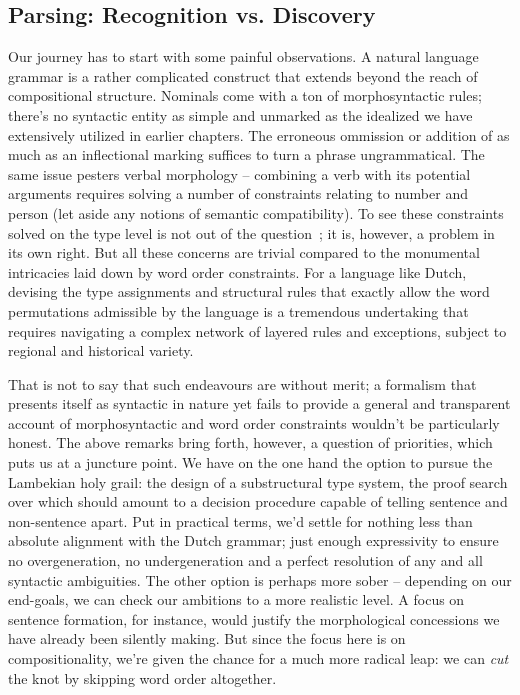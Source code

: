 \subsection{Parsing: Recognition vs. Discovery}
Our journey has to start with some painful observations.
A natural language grammar is a rather complicated construct that extends beyond the reach of compositional structure.
Nominals come with a ton of morphosyntactic rules; there's no syntactic entity as simple and unmarked as the idealized \np[s] we have extensively utilized in earlier chapters.
The erroneous ommission or addition of as much as an inflectional marking suffices to turn a phrase ungrammatical.
The same issue pesters verbal morphology -- combining a verb with its potential arguments requires solving a number of constraints relating to number and person (let aside any notions of semantic compatibility).
To see these constraints solved on the type level is not out of the question~\cite[inter alia]{moa,pollard2004type}; it is, however, a problem in its own right.
But all these concerns are trivial compared to the monumental intricacies laid down by word order constraints.
For a language like Dutch, devising the type assignments and structural rules that exactly allow the word permutations admissible by the language is a tremendous undertaking that requires navigating a complex network of layered rules and exceptions, subject to regional and historical variety.

That is not to say that such endeavours are without merit; a formalism that presents itself as syntactic in nature yet fails to provide a general and transparent account of morphosyntactic and word order constraints wouldn't be particularly honest.
The above remarks bring forth, however, a question of priorities, which puts us at a juncture point.
We have on the one hand the option to pursue the Lambekian holy grail: the design of a substructural type system, the proof search over which should amount to a decision procedure capable of telling sentence and non-sentence apart.
Put in practical terms, we'd settle for nothing less than absolute alignment with the Dutch grammar; just enough expressivity to ensure no overgeneration, no undergeneration and a perfect resolution of any and all syntactic ambiguities.
The other option is perhaps more sober -- depending on our end-goals, we can check our ambitions to a more realistic level.
A focus on sentence formation, for instance, would justify the morphological concessions we have already been silently making.
But since the focus here is on compositionality, we're given the chance for a much more radical leap: we can \textit{cut} the knot by skipping word order altogether.

